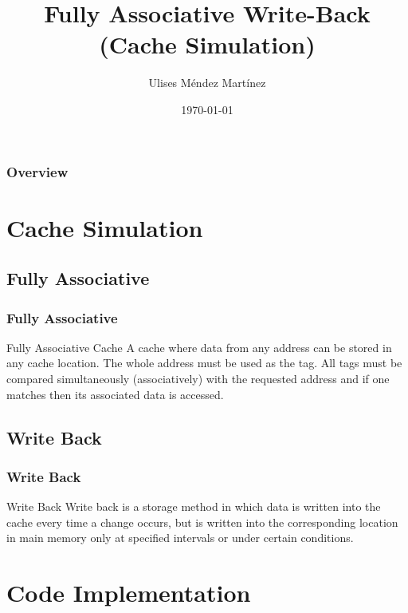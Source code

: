 \documentclass{beamer}
\title[Fully Associative Write-Back]{Fully Associative Write-Back \\ \small (Cache Simulation) } %
\author{Ulises M\'endez Mart\'{i}nez} %
\institute[UAG] %
{
Universidad Aut\'onoma de Guadalajara  \\ %
\medskip
\textit{ulisesmdzmtz@gmail.com} %
}
\date{\today} %
\begin{document}
\begin{frame}
\titlepage %
\end{frame}
\begin{frame}
\frametitle{Overview} %
\tableofcontents %
\end{frame}
\section{Cache Simulation}
\subsection{Fully Associative} 
\begin{frame}
\frametitle{Fully Associative}
\begin{block}{Fully Associative Cache}
A cache where data from any address can be stored in any cache location. The whole address must be used as the tag. All tags must be compared simultaneously (associatively) with the requested address and if one matches then its associated data is accessed.
\end{block}
\end{frame}
\subsection{Write Back}
\begin{frame}
\frametitle{Write Back}
\begin{block}{Write Back}
Write back is a storage method in which data is written into the cache every time a change occurs, but is written into the corresponding location in main memory only at specified intervals or under certain conditions.
\end{block}
\end{frame}
\section{Code Implementation}
\end{document}
